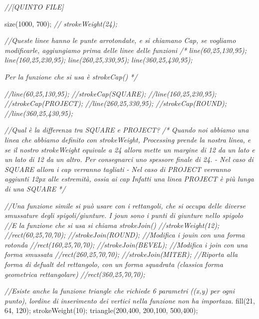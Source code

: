 \documentclass[
]{article}
\newenvironment{Shaded}{}{}
\newcommand{\CommentTok}[1]{\textcolor[rgb]{0.38,0.63,0.69}{\textit{#1}}}
\newcommand{\DecValTok}[1]{\textcolor[rgb]{0.25,0.63,0.44}{#1}}
\newcommand{\FunctionTok}[1]{\textcolor[rgb]{0.02,0.16,0.49}{#1}}
\newcommand{\OperatorTok}[1]{\textcolor[rgb]{0.40,0.40,0.40}{#1}}
\begin{document}
\begin{Shaded}
\begin{Highlighting}[]
\CommentTok{//[QUINTO FILE]}

\FunctionTok{size}\OperatorTok{(}\DecValTok{1000}\OperatorTok{,} \DecValTok{700}\OperatorTok{);}
\CommentTok{// strokeWeight(24);}

\CommentTok{//Queste linee hanno le punte arrotondate, e si chiamano Cap, se vogliamo modificarle, aggiungiamo prima delle linee delle funzioni}
\CommentTok{/*}
\CommentTok{    line(60,25,130,95);}
\CommentTok{    line(160,25,230,95);}
\CommentTok{    line(260,25,330,95);}
\CommentTok{    line(360,25,430,95);}

\CommentTok{Per la funzione che si usa è \textquotesingle{}strokeCap()\textquotesingle{}}
\CommentTok{*/}

    \CommentTok{//line(60,25,130,95);}
    \CommentTok{//strokeCap(SQUARE);}
    \CommentTok{//line(160,25,230,95);}
    \CommentTok{//strokeCap(PROJECT);}
    \CommentTok{//line(260,25,330,95);}
    \CommentTok{//strokeCap(ROUND);}
    \CommentTok{//line(360,25,430,95);}

\CommentTok{//Qual è la differenza tra SQUARE e PROJECT?}
\CommentTok{/*}
\CommentTok{Quando noi abbiamo una linea che abbiamo definito con strokeWeight, Processing prende la nostra linea, e se il nostro strokeWeight equivale a 24 allora mette un margine di 12 da un lato e un lato di 12 da un altro. Per consegnarci uno spessore finale di 24.}
\CommentTok{{-} Nel caso di SQUARE allora i cap verranno tagliati}
\CommentTok{{-} Nel caso di PROJECT verranno aggiunti 12px alle estremità, ossia ai cap}
\CommentTok{Infatti una linea PROJECT è più lunga di una SQUARE }
\CommentTok{*/}

\CommentTok{//Una funzione simile si può usare con i rettangoli, che si occupa delle diverse smussature degli spigoli/giunture. I joun sono i punti di giunture nello spigolo}
\CommentTok{//E la funzione che si usa si chiama \textquotesingle{}strokeJoin()\textquotesingle{}}
\CommentTok{//strokeWeight(12);}
\CommentTok{//rect(60,25,70,70);}
\CommentTok{//strokeJoin(ROUND); //Modifica i jouin con una forma rotonda }
\CommentTok{//rect(160,25,70,70);}
\CommentTok{//strokeJoin(BEVEL); //Modifica i join con una forma smussata}
\CommentTok{//rect(260,25,70,70);}
\CommentTok{//strokeJoin(MITER); //Riporta alla forma di defualt del rettangolo, con un forma squadrata (classica forma geometrica rettangolare)}
\CommentTok{//rect(360,25,70,70);}

\CommentTok{//Esiste anche la funzione triangle che richiede 6 parametri ((x,y) per ogni punto), l\textquotesingle{}ordine di inserimento dei vertici nella funzione non ha importaza. }
\FunctionTok{fill}\OperatorTok{(}\DecValTok{21}\OperatorTok{,} \DecValTok{64}\OperatorTok{,} \DecValTok{120}\OperatorTok{);}
\FunctionTok{strokeWeight}\OperatorTok{(}\DecValTok{10}\OperatorTok{);}
\FunctionTok{triangle}\OperatorTok{(}\DecValTok{200}\OperatorTok{,}\DecValTok{400}\OperatorTok{,} \DecValTok{200}\OperatorTok{,}\DecValTok{100}\OperatorTok{,} \DecValTok{500}\OperatorTok{,}\DecValTok{400}\OperatorTok{);}
\end{Highlighting}
\end{Shaded}
\end{document}
